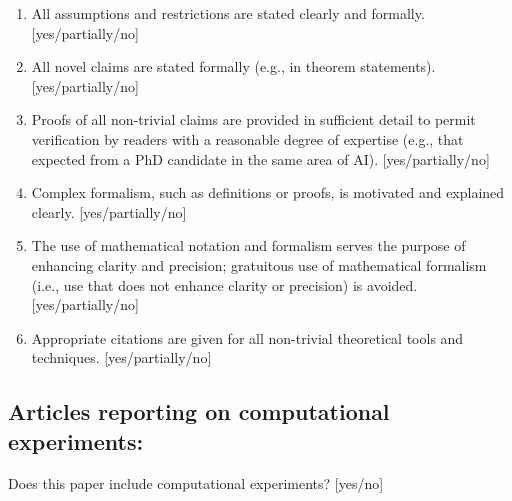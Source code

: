 \begin{enumerate}
    \item All assumptions and restrictions are stated clearly and formally. 
    [yes/partially/no]
    \item All novel claims are stated formally (e.g., in theorem statements). 
    [yes/partially/no]
    \item Proofs of all non-trivial claims are provided in sufficient detail to permit verification by readers with a reasonable degree of expertise (e.g., that expected from a PhD candidate in the same area of AI). [yes/partially/no]
    \item
    Complex formalism, such as definitions or proofs, is motivated and explained clearly.
    [yes/partially/no]
    \item 
    The use of mathematical notation and formalism serves the purpose of enhancing clarity and precision; gratuitous use of mathematical formalism (i.e., use that does not enhance clarity or precision) is avoided.
    [yes/partially/no]
    \item 
    Appropriate citations are given for all non-trivial theoretical tools and techniques. 
    [yes/partially/no]
\end{enumerate}

\subsection*{Articles reporting on computational experiments:}
Does this paper include computational experiments? [yes/no]

